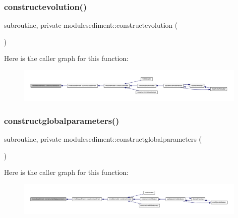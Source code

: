 \subsubsection{\texorpdfstring{constructevolution()}{constructevolution()}}
{\footnotesize\ttfamily subroutine, private modulesediment\+::constructevolution (\begin{DoxyParamCaption}{ }\end{DoxyParamCaption})\hspace{0.3cm}{\ttfamily [private]}}

Here is the caller graph for this function\+:\nopagebreak
\begin{figure}[H]
\begin{center}
\leavevmode
\includegraphics[width=350pt]{namespacemodulesediment_a65ecb7c9b87860dde4303791884a9956_icgraph}
\end{center}
\end{figure}
\mbox{\label{namespacemodulesediment_a58c9978541dc90a336fa76f940b8061b}} 
\subsubsection{\texorpdfstring{constructglobalparameters()}{constructglobalparameters()}}
{\footnotesize\ttfamily subroutine, private modulesediment\+::constructglobalparameters (\begin{DoxyParamCaption}{ }\end{DoxyParamCaption})\hspace{0.3cm}{\ttfamily [private]}}

Here is the caller graph for this function\+:\nopagebreak
\begin{figure}[H]
\begin{center}
\leavevmode
\includegraphics[width=350pt]{namespacemodulesediment_a58c9978541dc90a336fa76f940b8061b_icgraph}
\end{center}
\end{figure}
\mbox{\label{namespacemodulesediment_aacb4e3dc70adfbda3e0d8000b2088b3d}} 
